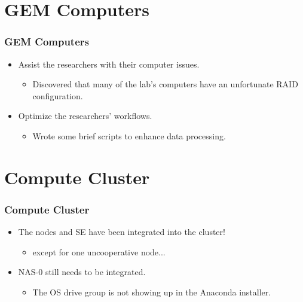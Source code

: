 \documentclass[aspectratio=169]{beamer}
\begin{document}

\section{GEM Computers}

\begin{frame}

  \frametitle{GEM Computers}

  \begin{itemize}
    \item Assist the researchers with their computer issues.
      \begin{itemize}
        \item Discovered that many of the lab's computers have an unfortunate
          RAID configuration.
      \end{itemize}
      \item Optimize the researchers' workflows.
        \begin{itemize}
          \item Wrote some brief scripts to enhance data processing.
        \end{itemize}
  \end{itemize}

\end{frame}



\section{Compute Cluster}

\begin{frame}

  \frametitle{Compute Cluster}

  \begin{multicols}{2}

  \begin{itemize}
    \item The nodes and SE have been integrated into the cluster!
      \begin{itemize}
        \item except for one uncooperative node...
      \end{itemize}
    \item NAS-0 still needs to be integrated.
      \begin{itemize}
        \item The OS drive group is not showing up in the Anaconda installer.
      \end{itemize}
  \end{itemize}

  \columnbreak


  \end{multicols}

\end{frame}
\end{document}
